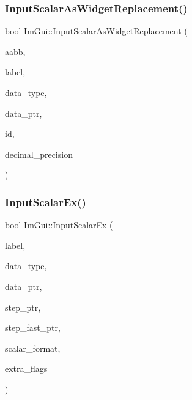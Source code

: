 \hypertarget{namespace_im_gui_a9b7223f54687d740a5961d7f278e01ef}{}\label{namespace_im_gui_a9b7223f54687d740a5961d7f278e01ef} 
\subsubsection{\texorpdfstring{Input\+Scalar\+As\+Widget\+Replacement()}{InputScalarAsWidgetReplacement()}}
{\footnotesize\ttfamily bool Im\+Gui\+::\+Input\+Scalar\+As\+Widget\+Replacement (\begin{DoxyParamCaption}\item[{const \hyperlink{struct_im_rect}{Im\+Rect} \&}]{aabb,  }\item[{const char $\ast$}]{label,  }\item[{Im\+Gui\+Data\+Type}]{data\+\_\+type,  }\item[{void $\ast$}]{data\+\_\+ptr,  }\item[{Im\+Gui\+ID}]{id,  }\item[{int}]{decimal\+\_\+precision }\end{DoxyParamCaption})}

\hypertarget{namespace_im_gui_a08c243542b1678859cf0e065f9e43865}{}\label{namespace_im_gui_a08c243542b1678859cf0e065f9e43865} 
\subsubsection{\texorpdfstring{Input\+Scalar\+Ex()}{InputScalarEx()}}
{\footnotesize\ttfamily bool Im\+Gui\+::\+Input\+Scalar\+Ex (\begin{DoxyParamCaption}\item[{const char $\ast$}]{label,  }\item[{Im\+Gui\+Data\+Type}]{data\+\_\+type,  }\item[{void $\ast$}]{data\+\_\+ptr,  }\item[{void $\ast$}]{step\+\_\+ptr,  }\item[{void $\ast$}]{step\+\_\+fast\+\_\+ptr,  }\item[{const char $\ast$}]{scalar\+\_\+format,  }\item[{Im\+Gui\+Input\+Text\+Flags}]{extra\+\_\+flags }\end{DoxyParamCaption})}

